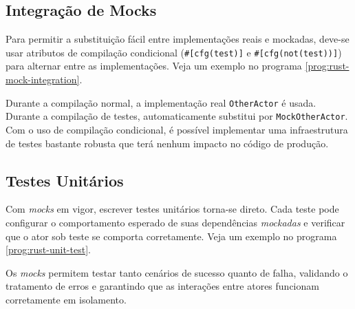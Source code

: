 \subsection{Integração de Mocks}

Para permitir a substituição fácil entre implementações reais e mockadas, deve-se usar atributos de compilação condicional (\texttt{\#[cfg(test)]} e \texttt{\#[cfg(not(test))]}) para alternar entre as implementações. Veja um exemplo no programa \ref{prog:rust-mock-integration}.

\begin{program}
  
  \caption{Alternância entre implementações reais e mockadas.\label{prog:rust-mock-integration}}
\end{program}

Durante a compilação normal, a implementação real \texttt{OtherActor} é usada. Durante a compilação de testes, automaticamente substitui por \texttt{MockOtherActor}. Com o uso de compilação condicional, é possível implementar uma infraestrutura de testes bastante robusta que terá nenhum impacto no código de produção.

\subsection{Testes Unitários}

Com \textit{mocks} em vigor, escrever testes unitários torna-se direto. Cada teste pode configurar o comportamento esperado de suas dependências \textit{mockadas} e verificar que o ator sob teste se comporta corretamente. Veja um exemplo no programa \ref{prog:rust-unit-test}.

\begin{program}
  
  \caption{Exemplo de teste unitário com mocks.\label{prog:rust-unit-test}}
\end{program}

Os \textit{mocks} permitem testar tanto cenários de sucesso quanto de falha, validando o tratamento de erros e garantindo que as interações entre atores funcionam corretamente em isolamento.

